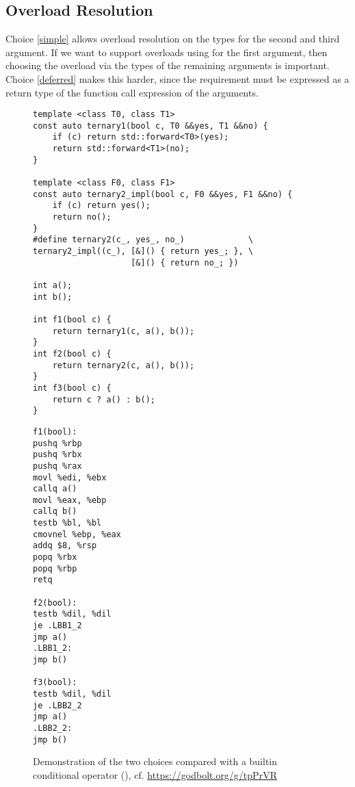 \subsection{Overload Resolution}
Choice \ref{simple} allows overload resolution on the types for the second and third argument.
If we want to support overloads using \bool for the first argument, then choosing the overload via the types of the remaining arguments is important.
Choice \ref{deferred} makes this harder, since the requirement must be expressed as a return type of the function call expression of the arguments.

\begin{figure}
  \centering
  \begin{minipage}[t]{.7\linewidth}
    \begin{lstlisting}[style=Vc]
template <class T0, class T1>
const auto ternary1(bool c, T0 &&yes, T1 &&no) {
    if (c) return std::forward<T0>(yes);
    return std::forward<T1>(no);
}

template <class F0, class F1>
const auto ternary2_impl(bool c, F0 &&yes, F1 &&no) {
    if (c) return yes();
    return no();
}
#define ternary2(c_, yes_, no_)             \
ternary2_impl((c_), [&]() { return yes_; }, \
                    [&]() { return no_; })

int a();
int b();

int f1(bool c) {
    return ternary1(c, a(), b());
}
int f2(bool c) {
    return ternary2(c, a(), b());
}
int f3(bool c) {
    return c ? a() : b();
}
    \end{lstlisting}
  \end{minipage}\hfill%
  \begin{minipage}[t]{.25\linewidth}
    \begin{lstlisting}[language={}]
f1(bool):
pushq %rbp
pushq %rbx
pushq %rax
movl %edi, %ebx
callq a()
movl %eax, %ebp
callq b()
testb %bl, %bl
cmovnel %ebp, %eax
addq $8, %rsp
popq %rbx
popq %rbp
retq

f2(bool):
testb %dil, %dil
je .LBB1_2
jmp a()
.LBB1_2:
jmp b()

f3(bool):
testb %dil, %dil
je .LBB2_2
jmp a()
.LBB2_2:
jmp b()
    \end{lstlisting}
  \end{minipage}
  \caption{Demonstration of the two choices compared with a builtin conditional operator (), cf. \url{https://godbolt.org/g/tpPrVR}}
  \label{fig:demo}
\end{figure}

